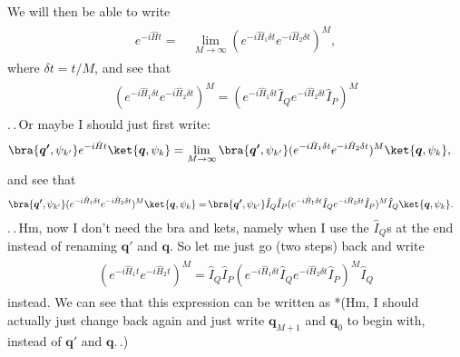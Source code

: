 \documentclass{report}
\begin{document}
We will then be able to write
\begin{align}
\begin{aligned}
	e^{-i \hat H t} =&\, \lim_{M\to\infty} (e^{-i \hat H_1 \delta t} e^{-i \hat H_2 \delta t})^M,
\end{aligned}
\end{align}
where $\delta t = t / M$, and see that
\begin{align}
\begin{aligned}
	(e^{-i \hat H_1 \delta t} e^{-i \hat H_2 \delta t})^M =
		(e^{-i \hat H_1 \delta t} \hat I_Q e^{-i \hat H_2 \delta t} \hat I_P)^M
\end{aligned}
\end{align}
.\,.\,Or maybe I should just first write:
\begin{align}
\begin{aligned}
	\bra{\boldsymbol{q'}, \psi_{k'}}
		e^{-i \hat H t} 
	\ket{\boldsymbol{q}, \psi_{k}}
	=&\, 
	\lim_{M\to\infty} 
	\bra{\boldsymbol{q'}, \psi_{k'}}
		(e^{-i \hat H_1 \delta t} e^{-i \hat H_2 \delta t})^M
	\ket{\boldsymbol{q}, \psi_{k}},
\end{aligned}
\end{align}
and see that 
\begin{align}
\begin{aligned}
	\bra{\boldsymbol{q'}, \psi_{k'}}
		(e^{-i \hat H_1 \delta t} e^{-i \hat H_2 \delta t})^M
	\ket{\boldsymbol{q}, \psi_{k}}
	=&\,
	\bra{\boldsymbol{q'}, \psi_{k'}} 
		\hat I_Q
		\hat I_P
		(e^{-i \hat H_1 \delta t} \hat I_Q e^{-i \hat H_2 \delta t} \hat I_P)^M
		\hat I_Q
	\ket{\boldsymbol{q}, \psi_{k}}.
\end{aligned}
\end{align}
.\,.\,Hm, now I don't need the bra and kets, namely when I use the $\hat I_Q$s at the end instead of renaming $\boldsymbol{q}'$ and $\boldsymbol{q}$. So let me just go (two steps) back and write 
\begin{align}
\begin{aligned}
	(e^{-i \hat H_1 t} e^{-i \hat H_2 t})^M =
		\hat I_Q
		\hat I_P
		(e^{-i \hat H_1 \delta t} \hat I_Q e^{-i \hat H_2 \delta t} \hat I_P)^M
		\hat I_Q
\end{aligned}
\end{align}
instead. We can see that this expression %
can be written as *(Hm, I should actually just change back again and just write $\boldsymbol{q}_{M+1}$ and $\boldsymbol{q}_0$ to begin with, instead of $\boldsymbol{q}'$ and $\boldsymbol{q}$.\,.)
\end{document}
